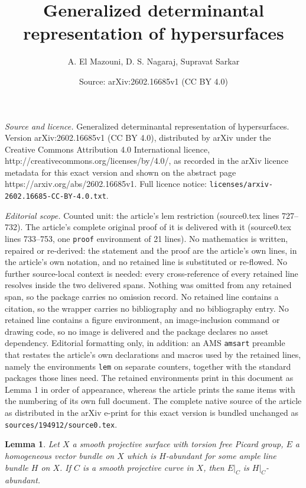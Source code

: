 \documentclass[10pt,a4paper]{amsart}
\title{Generalized determinantal representation of hypersurfaces}
\author{A. El Mazouni, D. S. Nagaraj, Supravat Sarkar}
\date{Source: arXiv:2602.16685v1 (CC BY 4.0)}
\newtheorem{lem}{Lemma}
\begin{document}
\maketitle

\noindent\emph{Source and licence.} Generalized determinantal representation of hypersurfaces. Version arXiv:2602.16685v1 (CC BY 4.0), distributed by arXiv under the Creative Commons Attribution 4.0 International licence, http://creativecommons.org/licenses/by/4.0/, as recorded in the arXiv licence metadata for this exact version and shown on the abstract page https://arxiv.org/abs/2602.16685v1. Full licence notice: \texttt{licenses/arxiv-2602.16685-CC-BY-4.0.txt}.\par\smallskip

\noindent\textit{Editorial scope.} Counted unit: the article's lem restriction (source0.tex lines 727--732). The article's complete original proof of it is delivered with it (source0.tex lines 733--753, one \texttt{proof} environment of 21 lines). No mathematics is written, repaired or re-derived: the statement and the proof are the article's own lines, in the article's own notation, and no retained line is substituted or re-flowed.  No further source-local context is needed: every cross-reference of every retained line resolves inside the two delivered spans.  Nothing was omitted from any retained span, so the package carries no omission record.  No retained line contains a citation, so the wrapper carries no bibliography and no bibliography entry.  No retained line contains a figure environment, an image-inclusion command or drawing code, so no image is delivered and the package declares no asset dependency.  Editorial formatting only, in addition: an AMS \texttt{amsart} preamble that restates the article's own declarations and macros used by the retained lines, namely the environments \texttt{lem} on separate counters, together with the standard packages those lines need.  The retained environments print in this document as Lemma 1 in order of appearance, whereas the article prints the same items with the numbering of its own full document.  The complete native source of the article as distributed in the arXiv e-print for this exact version is bundled unchanged as \texttt{sources/194912/source0.tex}.
\begin{lem}\label{restriction}
    Let $X$ a smooth projective surface with torsion free Picard group,
    $E$ a homogeneous vector bundle on $X$ which is $H$-abundant for 
    some ample line bundle $H$ on $X$. If $C$ is a smooth projective
    curve in $X$, then $E|_C$ is $H|_C$-abundant.
\end{lem}
\end{document}
